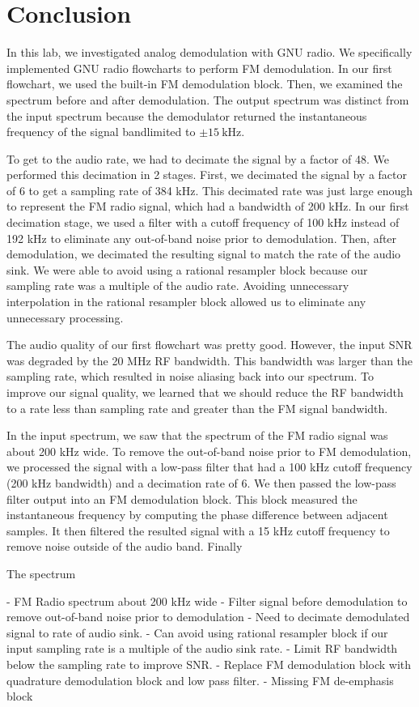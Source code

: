 \documentclass{article}
\begin{document}
\section{Conclusion}

In this lab, we investigated analog demodulation with GNU radio. We specifically implemented GNU radio flowcharts to perform FM demodulation. In our first flowchart, we used the built-in FM demodulation block. Then, we examined the spectrum before and after demodulation. The output spectrum was distinct from the input spectrum because the demodulator returned the instantaneous frequency of the signal bandlimited to $\pm 15\ \text{kHz}$.

To get to the audio rate, we had to decimate the signal by a factor of 48. We performed this decimation in 2 stages. First, we decimated the signal by a factor of 6 to get a sampling rate of 384 kHz. This decimated rate was just large enough to represent the FM radio signal, which had a bandwidth of 200 kHz. In our first decimation stage, we used a filter with a cutoff frequency of 100 kHz instead of 192 kHz to eliminate any out-of-band noise prior to demodulation. Then, after demodulation, we decimated the resulting signal to match the rate of the audio sink. We were able to avoid using a rational resampler block because our sampling rate was a multiple of the audio rate. Avoiding unnecessary interpolation in the rational resampler block allowed us to eliminate any unnecessary processing.

The audio quality of our first flowchart was pretty good. However, the input SNR was degraded by the 20 MHz RF bandwidth. This bandwidth was larger than the sampling rate, which resulted in noise aliasing back into our spectrum. To improve our signal 	quality, we learned that we should reduce the RF bandwidth to a rate less than sampling rate and greater than the FM signal bandwidth.

In the input spectrum, we saw that the spectrum of the FM radio signal was about 200 kHz wide. To remove the out-of-band noise prior to FM demodulation, we processed the signal with a low-pass filter that had a 100 kHz cutoff frequency (200 kHz bandwidth) and a decimation rate of 6. We then passed the low-pass filter output into an FM demodulation block. This block measured the instantaneous frequency by computing the phase difference between adjacent samples. It then filtered the resulted signal with a 15 kHz cutoff frequency to remove noise outside of the audio band. Finally  

The spectrum 

- FM Radio spectrum about 200 kHz wide
- Filter signal before demodulation to remove out-of-band noise prior to demodulation
- Need to decimate demodulated signal to rate of audio sink.
- Can avoid using rational resampler block if our input sampling rate is a multiple of the audio sink rate.
- Limit RF bandwidth below the sampling rate to improve SNR.
- Replace FM demodulation block with quadrature demodulation block and low pass filter.
- Missing FM de-emphasis block
%
%
	
\end{document}
